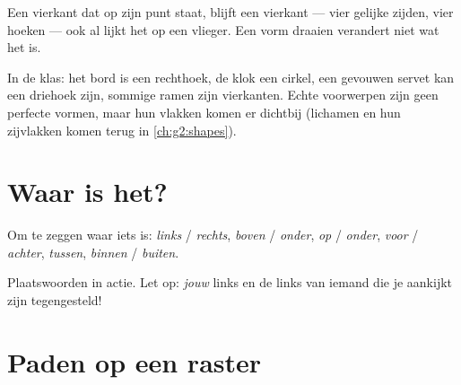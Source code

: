 \begin{example}\label{ex:g1:shapes:tilted}
Een vierkant dat op zijn punt staat, blijft een vierkant --- vier
gelijke zijden, vier hoeken --- ook al lijkt het op een vlieger. Een
vorm draaien verandert niet wat het is.
\end{example}

\begin{example}[Vormenjacht]\label{ex:g1:shapes:hunt}
In de klas: het bord is een rechthoek, de klok een cirkel, een
gevouwen servet kan een driehoek zijn, sommige ramen zijn vierkanten.
Echte voorwerpen zijn geen perfecte vormen, maar hun vlakken komen er
dichtbij (lichamen en hun zijvlakken komen terug in
\cref{ch:g2:shapes}).
\end{example}

\section{Waar is het?}

\begin{definition}[Plaatswoorden]\label{def:g1:shapes:position}
Om te zeggen waar iets is: \emph{links} / \emph{rechts},
\emph{boven} / \emph{onder}, \emph{op} / \emph{onder},
\emph{voor} / \emph{achter}, \emph{tussen},
\emph{binnen} / \emph{buiten}.
\end{definition}

\begin{omfigure}

{\small Plaatswoorden in actie. Let op: \emph{jouw} links en de links
van iemand die je aankijkt zijn tegengesteld!}
\end{omfigure}

\section{Paden op een raster}

